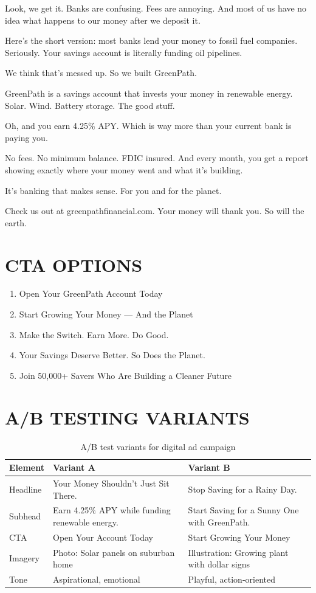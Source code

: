 \documentclass[
    language=english,
    doctype=advertising-copy,
    institution=none,
]{../../omnilatex}
\begin{document}
Look, we get it. Banks are confusing. Fees are annoying. And most of us have no idea what happens to our money after we deposit it.

Here's the short version: most banks lend your money to fossil fuel companies. Seriously. Your savings account is literally funding oil pipelines.

We think that's messed up. So we built GreenPath.

GreenPath is a savings account that invests your money in renewable energy. Solar. Wind. Battery storage. The good stuff.

Oh, and you earn 4.25\% APY. Which is way more than your current bank is paying you.

No fees. No minimum balance. FDIC insured. And every month, you get a report showing exactly where your money went and what it's building.

It's banking that makes sense. For you and for the planet.

Check us out at greenpathfinancial.com. Your money will thank you. So will the earth.

\section*{CTA OPTIONS}

\begin{enumerate}
    \item Open Your GreenPath Account Today
    \item Start Growing Your Money --- And the Planet
    \item Make the Switch. Earn More. Do Good.
    \item Your Savings Deserve Better. So Does the Planet.
    \item Join 50,000+ Savers Who Are Building a Cleaner Future
\end{enumerate}

\section*{A/B TESTING VARIANTS}

\begin{table}[h]
\centering
\small
\begin{tabular}{p{2cm}p{5cm}p{5cm}}
\toprule
\textbf{Element} & \textbf{Variant A} & \textbf{Variant B} \\
\midrule
Headline & Your Money Shouldn't Just Sit There. & Stop Saving for a Rainy Day. \\
Subhead & Earn 4.25\% APY while funding renewable energy. & Start Saving for a Sunny One with GreenPath. \\
CTA & Open Your Account Today & Start Growing Your Money \\
Imagery & Photo: Solar panels on suburban home & Illustration: Growing plant with dollar signs \\
Tone & Aspirational, emotional & Playful, action-oriented \\
\bottomrule
\end{tabular}
\caption{A/B test variants for digital ad campaign}
\end{table}
\end{document}
